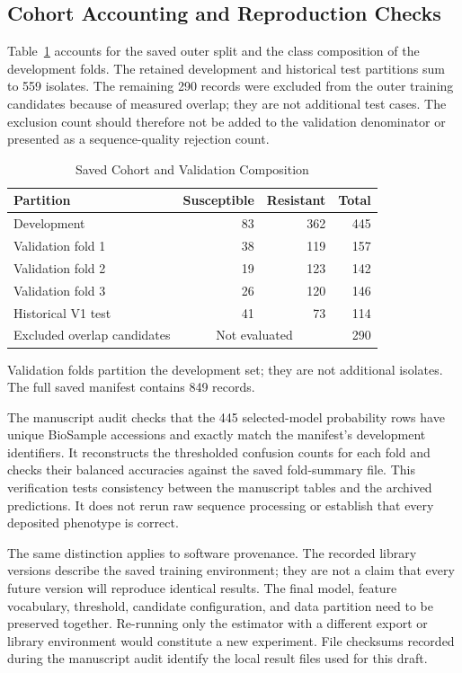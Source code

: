 \subsection{Cohort Accounting and Reproduction Checks}
Table~\ref{tab:cohort} accounts for the saved outer split and the class composition of the development folds. The retained development and historical test partitions sum to 559 isolates. The remaining 290 records were excluded from the outer training candidates because of measured overlap; they are not additional test cases. The exclusion count should therefore not be added to the validation denominator or presented as a sequence-quality rejection count.

\begin{table}[t]
\caption{Saved Cohort and Validation Composition}
\label{tab:cohort}
\centering\footnotesize
\begin{tabular}{lrrr}\toprule
Partition & Susceptible & Resistant & Total\\\midrule
Development &83&362&445\\
\quad Validation fold 1&38&119&157\\
\quad Validation fold 2&19&123&142\\
\quad Validation fold 3&26&120&146\\
Historical V1 test&41&73&114\\
Excluded overlap candidates&\multicolumn{2}{c}{Not evaluated}&290\\\bottomrule
\end{tabular}
\vspace{3pt}
\parbox{\columnwidth}{\footnotesize Validation folds partition the development set; they are not additional isolates. The full saved manifest contains 849 records.}
\end{table}

The manuscript audit checks that the 445 selected-model probability rows have unique BioSample accessions and exactly match the manifest's development identifiers. It reconstructs the thresholded confusion counts for each fold and checks their balanced accuracies against the saved fold-summary file. This verification tests consistency between the manuscript tables and the archived predictions. It does not rerun raw sequence processing or establish that every deposited phenotype is correct.

The same distinction applies to software provenance. The recorded library versions describe the saved training environment; they are not a claim that every future version will reproduce identical results. The final model, feature vocabulary, threshold, candidate configuration, and data partition need to be preserved together. Re-running only the estimator with a different export or library environment would constitute a new experiment. File checksums recorded during the manuscript audit identify the local result files used for this draft.

